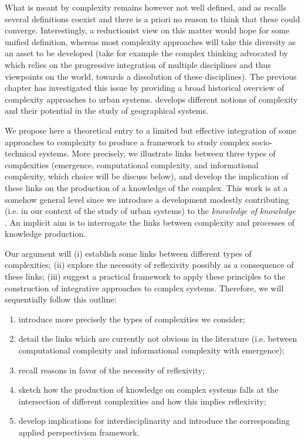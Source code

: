 What is meant by complexity remains however not well defined, and as \cite{chu2008criteria} recalls several definitions coexist and there is a priori no reason to think that these could converge. Interestingly, a reductionist view on this matter would hope for some unified definition, whereas most complexity approaches will take this diversity as an asset to be developed (take for example the complex thinking advocated by \cite{morin1991methode} which relies on the progressive integration of multiple disciplines and thus viewpoints on the world, towards a dissolution of these disciplines). The previous chapter \cite{batty2018which} has investigated this issue by providing a broad historical overview of complexity approaches to urban systems. \cite{manson2001simplifying} develops different notions of complexity and their potential in the study of geographical systems.

We propose here a theoretical entry to a limited but effective integration of some approaches to complexity to produce a framework to study complex socio-technical systems. More precisely, we illustrate links between three types of complexities (emergence, computational complexity, and informational complexity, which choice will be discuss below), and develop the implication of these links on the production of a knowledge of the complex. This work is at a somehow general level since we introduce a development modestly contributing (i.e. in our context of the study of urban systems) to the \emph{knowledge of knowledge} \cite{edgar1986methode}. An implicit aim is to interrogate the links between complexity and processes of knowledge production.


Our argument will (i) establish some links between different types of complexities; (ii) explore the necessity of reflexivity possibly as a consequence of these links; (iii) suggest a practical framework to apply these principles to the construction of integrative approaches to complex systems. Therefore, we will sequentially follow this outline:
\begin{enumerate}
	\item introduce more precisely the types of complexities we consider;
	\item detail the links which are currently not obvious in the literature (i.e. between computational complexity and informational complexity with emergence);
	\item recall reasons in favor of the necessity of reflexivity;
	\item sketch how the production of knowledge on complex systems falls at the intersection of different complexities and how this implies reflexivity;
	\item develop implications for interdisciplinarity and introduce the corresponding applied perspectivism framework.
\end{enumerate}







